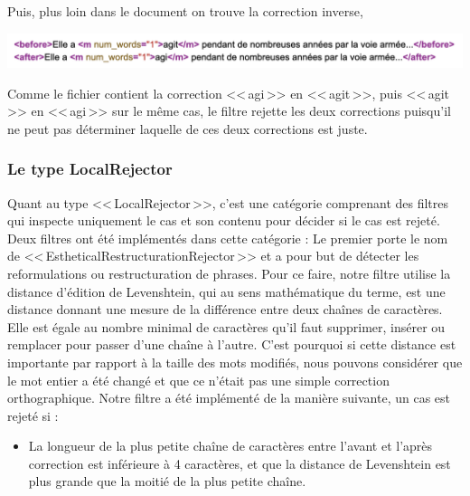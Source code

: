 \documentclass[11pt]{article}
\begin{document}
Puis, plus loin dans le document on trouve la correction inverse,

\begin{center}
\includegraphics[width=14cm]{exemple11.png} %
\end{center}

Comme le fichier contient la correction <<\,agi\,>> en <<\,agit\,>>, puis <<\,agit\,>> en <<\,agi\,>> sur le m\^{e}me cas, le filtre rejette les deux corrections puisqu'il ne peut pas d\'{e}terminer laquelle de ces deux corrections est juste.

\subsubsection{Le type LocalRejector}
Quant au type <<\,LocalRejector\,>>, c'est une cat\'{e}gorie comprenant des filtres qui inspecte uniquement le cas et son contenu pour d\'{e}cider si le cas est rejet\'{e}. Deux filtres ont \'{e}t\'{e} impl\'{e}ment\'{e}s dans cette cat\'{e}gorie :
\newline
Le premier porte le nom de <<\,EstheticalRestructurationRejector\,>> et a pour but de d\'{e}tecter les reformulations ou restructuration de phrases. Pour ce faire, notre filtre utilise la distance d'\'{e}dition de Levenshtein, qui au sens math\'{e}matique du terme, est une distance donnant une mesure de la diff\'{e}rence entre deux cha\^{i}nes de caract\`{e}res. Elle est \'{e}gale au nombre minimal de caract\`{e}res qu'il faut supprimer, ins\'{e}rer ou remplacer pour passer d'une cha\^{i}ne \`{a} l'autre. C'est pourquoi si cette distance est importante par rapport \`{a} la taille des mots modifi\'{e}s, nous pouvons consid\'{e}rer que le mot entier a \'{e}t\'{e} chang\'{e} et que ce n'\'{e}tait pas une simple correction orthographique. 
\newline
Notre filtre a \'{e}t\'{e} impl\'{e}ment\'{e} de la mani\`{e}re suivante, un cas est rejet\'{e} si :
\begin{itemize}
\item La longueur de la plus petite cha\^{i}ne de caract\`{e}res entre l'avant et l'apr\`{e}s correction est inf\'{e}rieure à 4 caract\`{e}res, et que la distance de Levenshtein est plus grande que la moiti\'{e} de la plus petite cha\^{i}ne.
\end{itemize}
\end{document}
